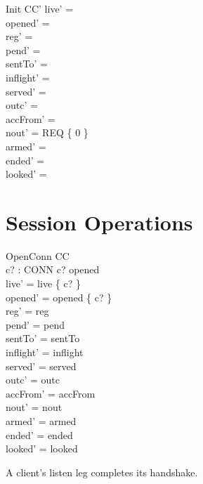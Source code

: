 \documentclass[a4paper,10pt,fleqn]{article}
\begin{document}
\begin{schema}{Init}
  CC'
\where
  live' = \emptyset \\
  opened' = \emptyset \\
  reg' = \emptyset \\
  pend' = \emptyset \\
  sentTo' = \emptyset \\
  inflight' = \emptyset \\
  served' = \emptyset \\
  outc' = \emptyset \\
  accFrom' = \emptyset \\
  nout' = REQ \cross \{ 0 \} \\
  armed' = \emptyset \\
  ended' = \emptyset \\
  looked' = \emptyset
\end{schema}

\section{Session Operations}

\begin{schema}{OpenConn}
  \Delta CC \\
  c? : CONN
\where
  c? \notin opened \\
  live' = live \cup \{ c? \} \\
  opened' = opened \cup \{ c? \} \\
  reg' = reg \\
  pend' = pend \\
  sentTo' = sentTo \\
  inflight' = inflight \\
  served' = served \\
  outc' = outc \\
  accFrom' = accFrom \\
  nout' = nout \\
  armed' = armed \\
  ended' = ended \\
  looked' = looked
\end{schema}

A client's listen leg completes its handshake.
\end{document}
